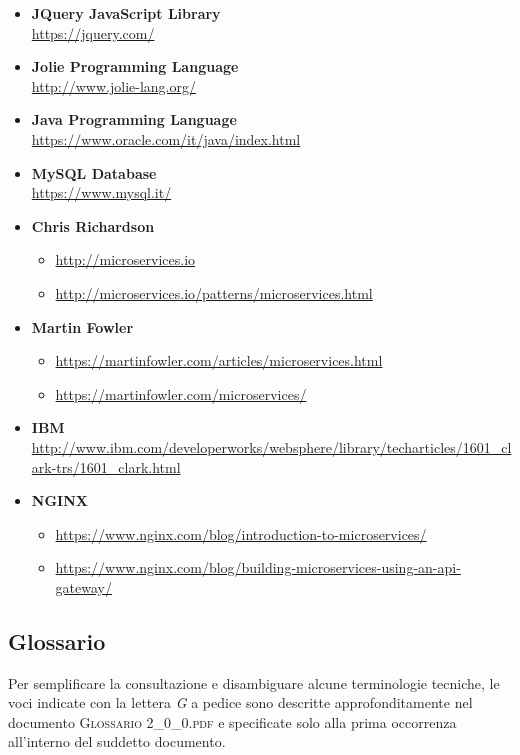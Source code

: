\begin{itemize}
	\item \textbf{JQuery JavaScript Library}\\
	\url{https://jquery.com/}
	\item \textbf{Jolie Programming Language}\\
	\url{http://www.jolie-lang.org/}
	\item \textbf{Java Programming Language}\\
	\url{https://www.oracle.com/it/java/index.html}
	\item \textbf{MySQL Database}\\
	\url{https://www.mysql.it/}
	\item \textbf{Chris Richardson}
	\begin{itemize}
		\item \url{http://microservices.io}
		\item \url{http://microservices.io/patterns/microservices.html}
	\end{itemize}
	\item \textbf{Martin Fowler}
	\begin{itemize}
		\item \url{https://martinfowler.com/articles/microservices.html}
		\item \url{https://martinfowler.com/microservices/}
	\end{itemize}
	\item \textbf{IBM}\\
	\url{http://www.ibm.com/developerworks/websphere/library/techarticles/1601_clark-trs/1601_clark.html}
	\item \textbf{NGINX}
	\begin{itemize}
		\item \url{https://www.nginx.com/blog/introduction-to-microservices/}
		\item \url{https://www.nginx.com/blog/building-microservices-using-an-api-gateway/}
	\end{itemize}
\end{itemize}



\subsection{Glossario}
Per semplificare la consultazione e disambiguare alcune terminologie tecniche, le voci indicate con la lettera \textit{G} a pedice sono descritte approfonditamente nel documento \textsc{Glossario 2\_0\_0.pdf} e specificate solo alla prima occorrenza all'interno del suddetto documento.